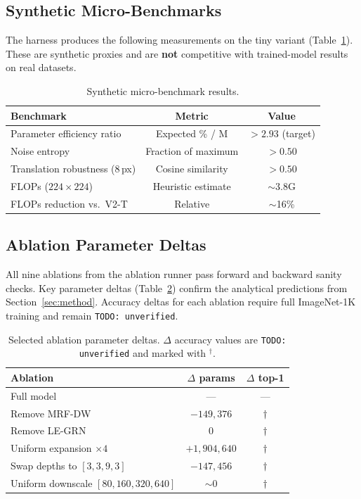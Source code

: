 \documentclass{article}
\begin{document}
\subsection{Synthetic Micro-Benchmarks}

The harness produces the following measurements on the tiny variant
(Table~\ref{tab:benchmarks}).  These are synthetic proxies and are
\textbf{not} competitive with trained-model results on real datasets.

\begin{table}[h]
  \centering
  \caption{Synthetic micro-benchmark results.}
  \label{tab:benchmarks}
  \begin{tabular}{lcc}
  \toprule
  Benchmark & Metric & Value \\
  \midrule
  Parameter efficiency ratio & Expected \% / M & $>2.93$ (target) \\
  Noise entropy & Fraction of maximum & $>0.50$ \\
  Translation robustness (8\,px) & Cosine similarity & $>0.50$ \\
  FLOPs ($224\times224$) & Heuristic estimate & $\sim$3.8G \\
  FLOPs reduction vs.\ V2-T & Relative & $\sim$16\% \\
  \bottomrule
  \end{tabular}
\end{table}

\subsection{Ablation Parameter Deltas}

All nine ablations from the ablation runner pass forward and backward
sanity checks.  Key parameter deltas (Table~\ref{tab:ablation_params})
confirm the analytical predictions from
Section~\ref{sec:method}.  Accuracy deltas for each ablation require
full ImageNet-1K training and remain \texttt{TODO: unverified}.

\begin{table}[h]
  \centering
  \caption{Selected ablation parameter deltas.
           $\Delta$ accuracy values are \texttt{TODO: unverified}
           and marked with $^\dagger$.}
  \label{tab:ablation_params}
  \begin{tabular}{lcc}
  \toprule
  Ablation & $\Delta$ params & $\Delta$ top-1 \\
  \midrule
  Full model & --- & --- \\
  Remove MRF-DW & $-149,376$ & $\dagger$ \\
  Remove LE-GRN & $0$ & $\dagger$ \\
  Uniform expansion $\times4$ & $+1,904,640$ & $\dagger$ \\
  Swap depths to $[3,3,9,3]$ & $-147,456$ & $\dagger$ \\
  Uniform downscale $[80,160,320,640]$ & $\sim 0$ & $\dagger$ \\
  \bottomrule
  \end{tabular}
\end{table}
\end{document}
